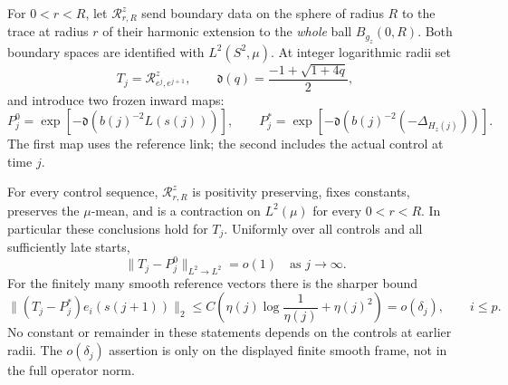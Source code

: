 For \(0<r<R\), let \(\mathcal R^z_{r,R}\) send boundary data on the sphere
of radius \(R\) to the trace at radius \(r\) of their harmonic extension
to the \emph{whole} ball \(B_{g_z}(0,R)\).  Both boundary spaces are
identified with \(L^2(S^2,\mu)\).  At integer logarithmic radii set
\[
 T_j=\mathcal R^z_{e^j,e^{j+1}},\qquad
 \mathfrak d(q)=\frac{-1+\sqrt{1+4q}}2,
\]
and introduce two frozen inward maps:
\begin{equation}
 P_j^0=\exp[-\mathfrak d(b(j)^{-2}L(s(j)))],
 \qquad
 P_j^*=\exp[-\mathfrak d(b(j)^{-2}(-\Delta_{H_z(j)}))].
 \label{n:eq-frozen-inward}
\end{equation}
The first map uses the reference link; the second includes the actual
control at time \(j\).

\begin{lemma}
\label{n:lem-inward-transfer}
For every control sequence, \(\mathcal R^z_{r,R}\) is positivity
preserving, fixes constants, preserves the \(\mu\)-mean, and is a contraction
on \(L^2(\mu)\) for every \(0<r<R\).  In particular these conclusions hold
for \(T_j\).  Uniformly over all controls and all sufficiently late starts,
\begin{equation}
 \|T_j-P_j^0\|_{L^2\to L^2}=o(1)
 \quad\text{as }j\longrightarrow\infty.
 \label{n:eq-operator-freeze}
\end{equation}
For the finitely many smooth reference vectors there is the sharper bound
\begin{equation}
 \|(T_j-P_j^*)e_i(s(j+1))\|_2
 \leq C\left(\eta(j)\log\frac1{\eta(j)}+\eta(j)^2\right)
 =o(\delta_j),\qquad i\leq p.
 \label{n:eq-frame-freeze}
\end{equation}
No constant or remainder in these statements depends on the controls at
earlier radii.  The \(o(\delta_j)\) assertion is only on the displayed
finite smooth frame, not in the full operator norm.
\end{lemma}

